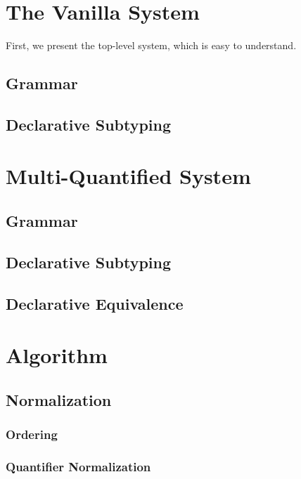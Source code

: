 \documentclass[a4,natbib=false]{article}
\begin{document}
\section{The Vanilla System}



First, we present the top-level system, which is easy to understand.

\subsection{Grammar}
\ottgrammartabular{
  \ottP\ottinterrule
  \ottN\ottinterrule
}

\subsection{Declarative Subtyping}
\ottdefnsDZero

\section{Multi-Quantified System}
\subsection{Grammar}
\ottgrammartabular{
  \ottiP\ottinterrule
  \ottiN\ottinterrule
}
\subsection{Declarative Subtyping}
\ottdefnsDOne


\subsection{Declarative Equivalence}
\ottdefnsEOne


\section{Algorithm}

\subsection{Normalization}
\subsubsection{Ordering}
\ottdefnsOrder

\subsubsection{Quantifier Normalization}
\ottdefnsNrm
\end{document}
